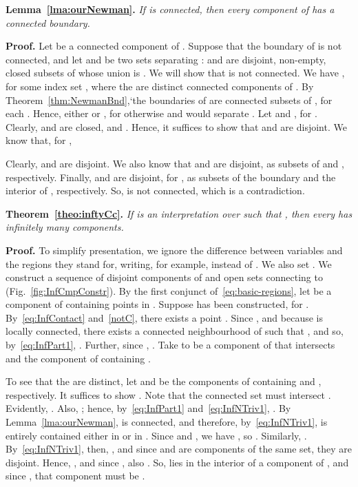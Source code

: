 \documentclass{article}
\newcommand{\qedsymbol}{\ding{113}}
\newenvironment{proof}{\par\noindent\textbf{Proof.}}{\mbox{}\hfill\qedsymbol\par\bigskip}
\newenvironment{swetheorem}[1]{\par\medskip\noindent\textbf{#1.}\hspace*{0.5em}\em}{\par\smallskip}
\begin{document}
\begin{swetheorem}{Lemma~\ref{lma:ourNewman}}
If  is connected, then every component of  has a
connected boundary.
\end{swetheorem}
\begin{proof}
Let  be a connected component of .  Suppose that the boundary
 of  is not connected, and let  and  be
two sets separating :  and  are disjoint,
non-empty, closed subsets of  whose union is . We will
show that  is not connected.  We have , for some index set , where the  are distinct
connected components of .  By
Theorem~\ref{thm:NewmanBnd},`the boundaries  of  are
connected subsets of , for each . Hence, either
 or , for
otherwise  and  would
separate . Let  and , for .
Clearly,  and  are closed, and . Hence, it
suffices to show that  and  are disjoint. We know that, for
,

Clearly,  and  are disjoint. We also know that 
 and  are disjoint, as 
subsets of  and , respectively. Finally,  
and  are disjoint, for , as subsets of the boundary and the 
interior of , respectively. So,  is not connected, which is a contradiction.
\end{proof}

\begin{swetheorem}{Theorem~\ref{theo:inftyCc}}
	If  is an interpretation over  such that
	, then every 
	has infinitely many components.
\end{swetheorem}
\begin{proof}
To simplify presentation, we ignore the difference  between variables and the regions 
they stand for, writing, for example,  instead of . We also set 
. We construct a sequence of disjoint components  of  
and open sets  connecting  to  (Fig.~\ref{fig:InfCmpConstr}). By the first 
conjunct of~\eqref{eq:basic-regions}, let  be a component of  containing points in 
. Suppose  has been constructed, for . By~\eqref{eq:InfContact} 
and~\eqref{notC}, there exists a point . Since 
, and because  is locally connected, 
there exists a connected neighbourhood  of  such that 
, and so, 
by~\eqref{eq:InfPart1}, . Further, since ,
. Take  to be a component of  that 
intersects  and  the component of  containing .
	
To see that the  are distinct, let  and  be the
components of  containing  and ,
respectively. It suffices to show .
Note that the connected set  must intersect .
Evidently, .
Also, ; hence,
by~\eqref{eq:InfPart1} and~\eqref{eq:InfNTriv1}, .  By Lemma~\ref{lma:ourNewman},
 is connected, and therefore, by~\eqref{eq:InfNTriv1},
is entirely contained either in  or in
. Since  and
, we have , so . Similarly,
.  By~\eqref{eq:InfNTriv1}, then,
, and since 
and  are components of the same set, they are
disjoint. Hence, , and since
, also . So,  lies in the interior of
a component of , and since , that component must be .
\end{proof}
\end{document}
